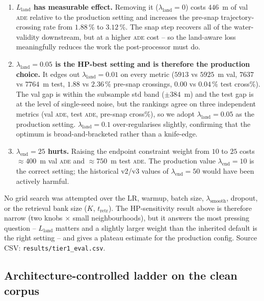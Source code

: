 \documentclass[oneside, a4paper, onecolumn, 11pt]{article}
\newcommand{\ade}{\textsc{ade}}
\begin{document}
\begin{enumerate}[leftmargin=*]
  \item \textbf{$L_{\mathrm{land}}$ has measurable effect.}
        Removing it ($\lambda_{\mathrm{land}} = 0$) costs $446$~m of
        val \ade{} relative to the production setting and increases
        the pre-snap trajectory-crossing rate from $1.88\,\%$ to
        $3.12\,\%$.  The snap step recovers all of the water-validity
        downstream, but at a higher \ade{} cost -- so the land-aware
        loss meaningfully reduces the work the post-processor must do.
  \item \textbf{$\lambda_{\mathrm{land}} = 0.05$ is the HP-best
        setting and is therefore the production choice.}  It edges
        out $\lambda_{\mathrm{land}} = 0.01$ on every metric
        ($5913$ vs $5925$~m val, $7637$ vs $7764$~m test, $1.88$ vs
        $2.36\,\%$ pre-snap crossings, $0.00$ vs $0.04\,\%$ test
        cross\%).  The val gap is within the subsample std band
        ($\pm 384$~m) and the test gap is at the level of single-seed
        noise, but the rankings agree on three independent metrics
        (val \ade{}, test \ade{}, pre-snap cross\%), so we adopt
        $\lambda_{\mathrm{land}} = 0.05$ as the production setting.
        $\lambda_{\mathrm{land}} = 0.1$ over-regularises slightly,
        confirming that the optimum is broad-and-bracketed rather
        than a knife-edge.
  \item \textbf{$\lambda_{\mathrm{end}} = 25$ hurts.}  Raising the
        endpoint constraint weight from $10$ to $25$ costs $\approx
        400$~m val \ade{} and $\approx 750$~m test \ade.  The
        production value $\lambda_{\mathrm{end}} = 10$ is the correct
        setting; the historical v2/v3 values of
        $\lambda_{\mathrm{end}} = 50$ would have been actively
        harmful.
\end{enumerate}

No grid search was attempted over the LR, warmup, batch size,
$\lambda_{\mathrm{smooth}}$, dropout, or the retrieval bank size
($K$, $t_{\mathrm{retr}}$).  The HP-sensitivity result above is
therefore narrow (two knobs $\times$ small neighbourhoods), but it
answers the most pressing question -- $L_{\mathrm{land}}$ matters
and a slightly larger weight than the inherited default is the
right setting -- and gives a plateau estimate for the production
config.  Source CSV: \texttt{results/tier1\_eval.csv}.

\subsection{Architecture-controlled ladder on the clean corpus}
\label{sec:ladderclean}
\end{document}
